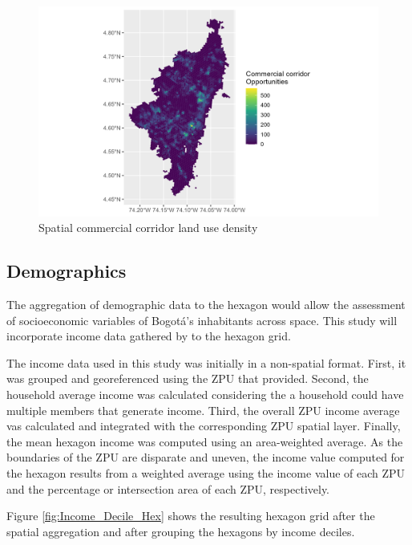 \documentclass[12pt, a4paper]{report}
\begin{document}
\begin{figure}[H]
    \centering
    \includegraphics[width=13cm]{Data/Results/Images/Opportunities_COD_21.png}
    \caption{Spatial commercial corridor land use density}
    \label{fig:Opportunities_Spatial}
\end{figure}


\subsection{Demographics} \label{Demographics}

The aggregation of demographic data to the hexagon would allow the assessment of socioeconomic variables of Bogotá's inhabitants across space. This study will incorporate income data gathered by \cite{secretariadistritaldeplaneacionMicrodatosEncuestaMultiproposito2023} to the hexagon grid.

The income data used in this study was initially in a non-spatial format. First, it was grouped and georeferenced using the ZPU that \cite{secretariadistritaldeplaneacionMicrodatosEncuestaMultiproposito2023} provided. Second, the household average income was calculated considering the a household could have multiple members that generate income. Third, the overall ZPU income average vas calculated and integrated with the corresponding ZPU spatial layer. Finally, the mean hexagon income was computed using an area-weighted average. As the boundaries of the ZPU are disparate and uneven, the income value computed for the hexagon results from a weighted average using the income value of each ZPU and the percentage or intersection area of each ZPU, respectively. 

Figure \ref{fig:Income_Decile_Hex} shows the resulting hexagon grid after the spatial aggregation and after grouping the hexagons by income deciles.
\end{document}
